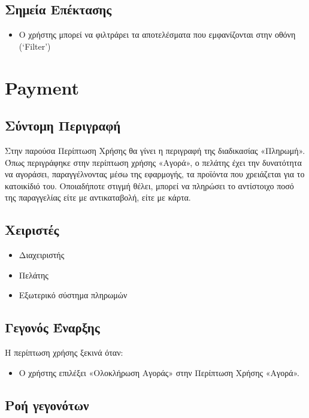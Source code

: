 \documentclass[12pt,a4paper,twoside]{book}
\begin{document}
\subsection{Σημεία Επέκτασης}
\begin{itemize}
  \item Ο χρήστης μπορεί να φιλτράρει τα αποτελέσματα που εμφανίζονται στην οθόνη (`Filter') %
\end{itemize}

\section{Payment} %

\subsection{Σύντομη Περιγραφή}
Στην παρούσα Περίπτωση Χρήσης θα γίνει η περιγραφή της διαδικασίας «Πληρωμή». Όπως περιγράφηκε στην περίπτωση χρήσης «Αγορά», ο πελάτης έχει την δυνατότητα να αγοράσει, παραγγέλνοντας μέσω της εφαρμογής, τα προϊόντα που χρειάζεται για το κατοικίδιό του. Οποιαδήποτε στιγμή θέλει, μπορεί να πληρώσει το αντίστοιχο ποσό της παραγγελίας είτε με αντικαταβολή, είτε με κάρτα. %

\subsection{Χειριστές}
\begin{itemize}
  \item Διαχειριστής
  \item Πελάτης
  \item Εξωτερικό σύστημα πληρωμών
\end{itemize}

\subsection{Γεγονός Έναρξης}
Η περίπτωση χρήσης ξεκινά όταν:
\begin{itemize}
  \item Ο χρήστης επιλέξει «Ολοκλήρωση Αγοράς» στην Περίπτωση Χρήσης «Αγορά». %
\end{itemize}

\subsection{Ροή γεγονότων}
\end{document}

